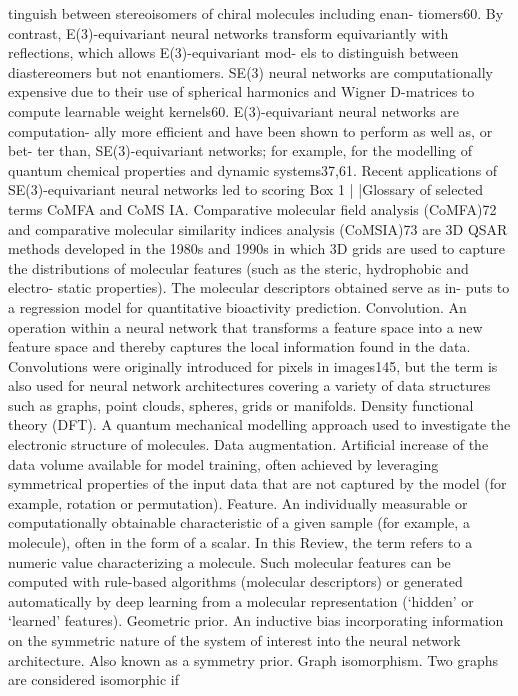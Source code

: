 tinguish between stereoisomers of chiral molecules including enan-
tiomers60. By contrast, E(3)-equivariant neural networks transform
equivariantly with reflections, which allows E(3)-equivariant mod-
els to distinguish between diastereomers but not enantiomers. SE(3)
neural networks are computationally expensive due to their use of
spherical harmonics and Wigner D-matrices to compute learnable
weight kernels60. E(3)-equivariant neural networks are computation-
ally more efficient and have been shown to perform as well as, or bet-
ter than, SE(3)-equivariant networks; for example, for the modelling
of quantum chemical properties and dynamic systems37,61. Recent
applications of SE(3)-equivariant neural networks led to scoring
Box 1 | |Glossary of selected terms
CoMFA and CoMS IA. Comparative molecular field analysis
(CoMFA)72 and comparative molecular similarity indices analysis
(CoMSIA)73 are 3D QSAR methods developed in the 1980s and
1990s in which 3D grids are used to capture the distributions of
molecular features (such as the steric, hydrophobic and electro-
static properties). The molecular descriptors obtained serve as in-
puts to a regression model for quantitative bioactivity prediction.
Convolution. An operation within a neural network that
transforms a feature space into a new feature space and thereby
captures the local information found in the data. Convolutions
were originally introduced for pixels in images145, but the term
is also used for neural network architectures covering a variety
of data structures such as graphs, point clouds, spheres, grids or
manifolds.
Density functional theory (DFT). A quantum mechanical
modelling approach used to investigate the electronic structure of
molecules.
Data augmentation. Artificial increase of the data volume available
for model training, often achieved by leveraging symmetrical
properties of the input data that are not captured by the model (for
example, rotation or permutation).
Feature. An individually measurable or computationally obtainable
characteristic of a given sample (for example, a molecule), often in
the form of a scalar. In this Review, the term refers to a numeric
value characterizing a molecule. Such molecular features can be
computed with rule-based algorithms (molecular descriptors)
or generated automatically by deep learning from a molecular
representation (‘hidden’ or ‘learned’ features).
Geometric prior. An inductive bias incorporating information
on the symmetric nature of the system of interest into the neural
network architecture. Also known as a symmetry prior.
Graph isomorphism. Two graphs are considered isomorphic if
